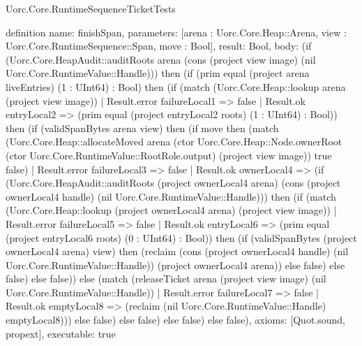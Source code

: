\begin{lexlean}{Uorc.Core.RuntimeSequenceTicketTests}
\begin{semanticmodule}
definition{
  name: finishSpan,
  parameters: [arena : Uorc.Core.Heap::Arena, view : Uorc.Core.RuntimeSequence::Span, move : Bool],
  result: Bool,
  body: (if (Uorc.Core.HeapAudit::auditRoots arena (cons (project view image) (nil Uorc.Core.RuntimeValue::Handle))) then (if (prim equal (project arena liveEntries) (1 : UInt64) : Bool) then (if (match (Uorc.Core.Heap::lookup arena (project view image))
    | Result.error failureLocal1 => false
    | Result.ok entryLocal2 => (prim equal (project entryLocal2 roots) (1 : UInt64) : Bool)) then (if (validSpanBytes arena view) then (if move then (match (Uorc.Core.Heap::allocateMoved arena (ctor Uorc.Core.Heap::Node.ownerRoot (ctor Uorc.Core.RuntimeValue::RootRole.output) (project view image)) true false)
    | Result.error failureLocal3 => false
    | Result.ok ownerLocal4 => (if (Uorc.Core.HeapAudit::auditRoots (project ownerLocal4 arena) (cons (project ownerLocal4 handle) (nil Uorc.Core.RuntimeValue::Handle))) then (if (match (Uorc.Core.Heap::lookup (project ownerLocal4 arena) (project view image))
      | Result.error failureLocal5 => false
      | Result.ok entryLocal6 => (prim equal (project entryLocal6 roots) (0 : UInt64) : Bool)) then (if (validSpanBytes (project ownerLocal4 arena) view) then (reclaim (cons (project ownerLocal4 handle) (nil Uorc.Core.RuntimeValue::Handle)) (project ownerLocal4 arena)) else false) else false) else false)) else (match (releaseTicket arena (project view image) (nil Uorc.Core.RuntimeValue::Handle))
    | Result.error failureLocal7 => false
    | Result.ok emptyLocal8 => (reclaim (nil Uorc.Core.RuntimeValue::Handle) emptyLocal8))) else false) else false) else false) else false),
  axioms: [Quot.sound, propext],
  executable: true
}


\end{semanticmodule}
\end{lexlean}
